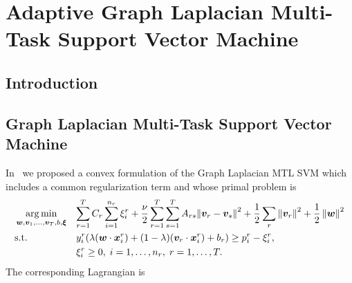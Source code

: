 
\chapter{Adaptive Graph Laplacian Multi-Task Support Vector Machine} %
\label{Chapter5}

{\bf \small{

}}

\section{Introduction}

\section{Graph Laplacian Multi-Task Support Vector Machine}
In~\cite{RuizAD20} we proposed a convex formulation of the Graph Laplacian MTL SVM which includes a common regularization term and whose primal problem is
%
\begin{equation}\label{eq:primal_cvx-graphLap}
  \begin{aligned}
  & \argmin_{\myvec{w}, \myvec{v}_1, \ldots, \myvec{v}_T, b , \myvec{\xi}}
  & & { \sum_{r=1}^T C_r \sum_{i=1}^{n_r} {\xi_i^r}  + \frac{\nu}{2} \sum_{r=1}^T \sum_{s=1}^T A_{rs} {\| \myvec{v}_r - \myvec{v}_s \|}^2 + \frac{1}{2} \sum_r \norm{\myvec{v}_r}^2 + \frac{1}{2} \norm{\myvec{w}}^2} \\
  & \text{s.t.}
  & & y_i^r (\lambda (\myvec{w} \cdot \myvec{x}_i^r) + (1 - \lambda) (\myvec{v}_r \cdot \myvec{x}_i^r) + b_r) \geq p_i^r - \xi_i^r  ,\\
  & & & \xi_i^r \geq 0,  \;  i = 1, \dotsc, n_r, \; r=1, \dotsc, T .
  \end{aligned}
\end{equation}
%
The corresponding Lagrangian is
